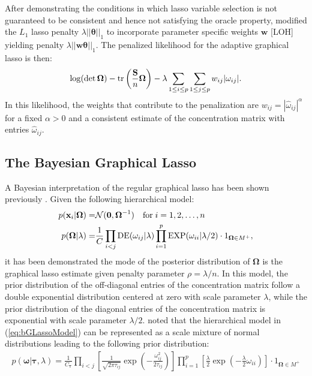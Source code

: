 \begin{DoubleSpace*}
After demonstrating the conditions in which lasso variable selection is not guaranteed to be consistent and hence not satisfying the oracle property, \cite{zou2006} modified the $L_1$ lasso penalty $\lambda ||\boldsymbol{\theta}||_1$ to incorporate parameter specific weights $\textbf{w}$ [LOH] yielding penalty $\lambda ||\textbf{w} \boldsymbol{\theta}||_1$. The penalized likelihood for the adaptive graphical lasso is then:
\begin{align}
\log(\det \boldsymbol{\Omega})-\operatorname{tr} \left(\frac{\mathbf{S}}{n} \boldsymbol{\Omega}\right) - \lambda \sum_{1\leq i \leq p} \sum_{1 \leq j \leq p} w_{ij} |\omega_{ij}|.
\end{align}
In this likelihood, the weights that contribute to the penalization are $w_{ij}=|\hat{\omega}_{ij}|^\alpha$ for a fixed $\alpha >0$ and a consistent estimate of the concentration matrix with entries $\hat{\omega}_{ij}$.

\subsection{The Bayesian Graphical Lasso}
A Bayesian interpretation of the regular graphical lasso \cite{friedman2007} has been shown previously \cite{wang2012}. Given the following hierarchical model:
\begin{align}
p(\textbf{x}_i|\boldsymbol{\Omega}) =& \mathcal{N}(\textbf{0},\boldsymbol{\Omega}^{-1}) \quad \text{for} \; i=1,2,\hdots,n\\
p(\boldsymbol{\Omega}|\lambda) =& \frac{1}{C} \prod_{i<j} \operatorname{DE}(\omega_{ij}|\lambda) \prod_{i=1}^{p} \operatorname{EXP} (\omega_{ii} | \lambda / 2) \cdot 1_{\boldsymbol{\Omega}\in M^+},
\label{eq:bGLassoModel}
\end{align}
it has been demonstrated the mode of the posterior distribution of $\boldsymbol{\Omega}$ is the graphical lasso estimate given penalty parameter $\rho=\lambda/n$. In this model, the prior distribution of the off-diagonal entries of the concentration matrix follow a double exponential distribution centered at zero with scale parameter $\lambda$, while the prior distribution of the diagonal entries of the concentration matrix is exponential with scale parameter $\lambda/2$. \cite{wang2012}  noted that the hierarchical model in (\ref{eq:bGLassoModel}) can be represented as a scale mixture of normal distributions \cite{andrews1974,west1987} leading to the following prior distribution:
\begin{align}
p(\boldsymbol{\omega}| \boldsymbol{\tau},\lambda)=\frac{1}{C_{\boldsymbol{\tau}}} \prod_{i<j} \left[ \frac{1}{\sqrt{2\pi \tau_{ij}}} \exp \left(- \frac{\omega_{ij}^2}{2\tau_{ij}}\right) \right] \prod_{i=1}^{p} \left[\frac{\lambda}{2} \exp \left(-\frac{\lambda}{2}\omega_{ii} \right)\right] \cdot 1_{\boldsymbol{\Omega}\in M^+}
\end{align}


\end{DoubleSpace*}
